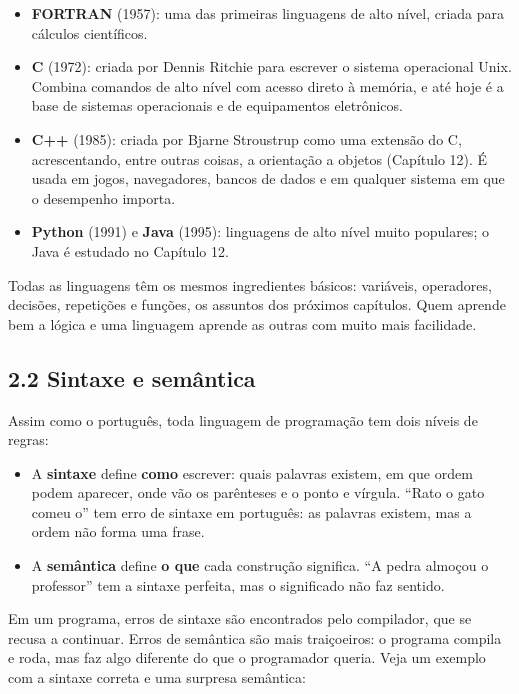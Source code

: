 \begin{itemize}
  \item \textbf{FORTRAN} (1957): uma das primeiras linguagens de alto nível, criada para cálculos científicos.
  \item \textbf{C} (1972): criada por Dennis Ritchie para escrever o sistema operacional Unix. Combina comandos de alto nível com acesso direto à memória, e até hoje é a base de sistemas operacionais e de equipamentos eletrônicos.
  \item \textbf{C++} (1985): criada por Bjarne Stroustrup como uma extensão do C, acrescentando, entre outras coisas, a orientação a objetos (Capítulo 12). É usada em jogos, navegadores, bancos de dados e em qualquer sistema em que o desempenho importa.
  \item \textbf{Python} (1991) e \textbf{Java} (1995): linguagens de alto nível muito populares; o Java é estudado no Capítulo 12.
\end{itemize}

Todas as linguagens têm os mesmos ingredientes básicos: variáveis, operadores, decisões, repetições e funções, os assuntos dos próximos capítulos. Quem aprende bem a lógica e uma linguagem aprende as outras com muito mais facilidade.

\subsection{2.2 Sintaxe e semântica}

Assim como o português, toda linguagem de programação tem dois níveis de regras:

\begin{itemize}
  \item A \textbf{sintaxe} define \textbf{como} escrever: quais palavras existem, em que ordem podem aparecer, onde vão os parênteses e o ponto e vírgula. ``Rato o gato comeu o'' tem erro de sintaxe em português: as palavras existem, mas a ordem não forma uma frase.
  \item A \textbf{semântica} define \textbf{o que} cada construção significa. ``A pedra almoçou o professor'' tem a sintaxe perfeita, mas o significado não faz sentido.
\end{itemize}

Em um programa, erros de sintaxe são encontrados pelo compilador, que se recusa a continuar. Erros de semântica são mais traiçoeiros: o programa compila e roda, mas faz algo diferente do que o programador queria. Veja um exemplo com a sintaxe correta e uma surpresa semântica:

